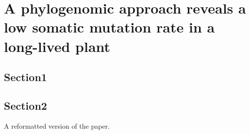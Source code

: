 \chapter{A phylogenomic approach reveals a low somatic mutation rate in a long-lived plant}
\section{Section1}
\section{Section2}

A reformatted version of the paper.
